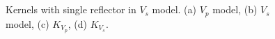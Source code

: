 \begin{figure}[!htb]
   \centering
   \\
   \\
   \caption{Kernels with single reflector in $V_s$ model. (a) $V_p$ model, (b) $V_s$ model, (c) $K_{V_p}$, (d) $K_{V_s}$.}
   \label{fig:kernel2}
\end{figure}


